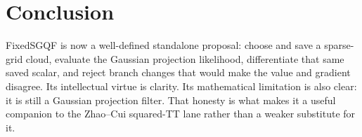 \documentclass[11pt]{article}
\numberwithin{equation}{section}
\begin{document}
\section{Conclusion}
\label{sec:p31-conclusion}

FixedSGQF is now a well-defined standalone proposal: choose and save a
sparse-grid cloud, evaluate the Gaussian projection likelihood, differentiate
that same saved scalar, and reject branch changes that would make the value and
gradient disagree.  Its intellectual virtue is clarity.  Its mathematical
limitation is also clear: it is still a Gaussian projection filter.  That
honesty is what makes it a useful companion to the Zhao--Cui squared-TT lane
rather than a weaker substitute for it.



\end{document}
